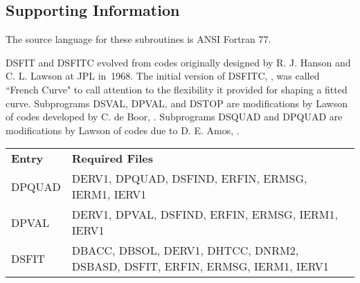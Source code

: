 \documentclass[twoside]{MATH77}
\begin{document}
\subsection{Supporting Information}

The source language for these subroutines is ANSI Fortran 77.

DSFIT and DSFITC evolved from codes originally designed by R.  J.  Hanson
and C.  L.  Lawson at JPL in~1968.  The initial version of DSFITC,
\cite{Lang:1969:FC}, was called ``French Curve" to call attention to the
flexibility it provided for shaping a fitted curve.  Subprograms DSVAL,
DPVAL, and DSTOP are modifications by Lawson of codes developed by C.  de
Boor, \cite{deBoor:1978:APG}.  Subprograms DSQUAD and DPQUAD are
modifications by Lawson of codes due to D.  E.  Amos,
\cite{Amos:1979:xxx}.


\begin{tabular}{@{\bf}l@{\hspace{5pt}}l}
\bf Entry & \hspace{.35in} {\bf Required Files}\vspace{2pt} \\
DPQUAD & \parbox[t]{2.7in}{ \raggedright
DERV1, DPQUAD, DSFIND, ERFIN, ERMSG, IERM1, IERV1\rule[-5pt]{0pt}{8pt}}\\
DPVAL & \parbox[t]{2.7in}{ \raggedright
DERV1, DPVAL, DSFIND, ERFIN, ERMSG, IERM1, IERV1\rule[-5pt]{0pt}{8pt}}\\
DSFIT & \parbox[t]{2.7in}{ \raggedright
DBACC, DBSOL, DERV1, DHTCC, DNRM2, DSBASD, DSFIT, ERFIN, ERMSG, IERM1,
IERV1\rule[-5pt]{0pt}{8pt}}\\
\end{tabular}
\end{document}
